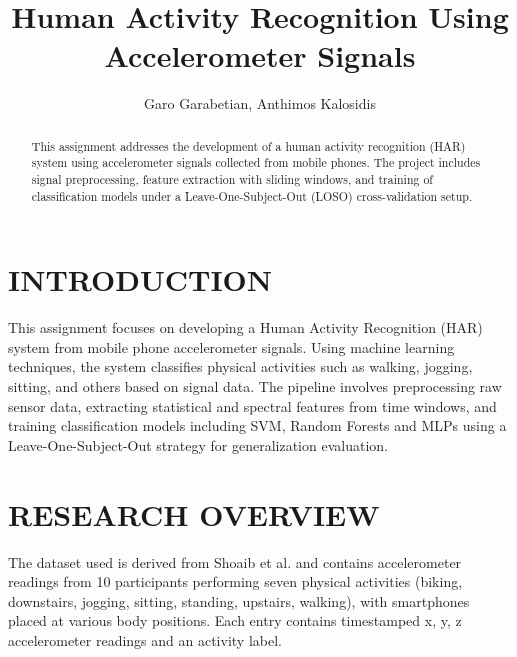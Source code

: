 \documentclass[runningheads]{llncs}
\begin{document}
\title{Human Activity Recognition Using Accelerometer Signals}

\author{Garo Garabetian, Anthimos Kalosidis}

\newpage
\maketitle
\pagestyle{plain}

\begin{abstract}
This assignment addresses the development of a human activity recognition (HAR) system using accelerometer signals collected from mobile phones. The project includes signal preprocessing, feature extraction with sliding windows, and training of classification models under a Leave-One-Subject-Out (LOSO) cross-validation setup.
\end{abstract}

\section{INTRODUCTION}
This assignment focuses on developing a Human Activity Recognition (HAR) system from mobile phone accelerometer signals. Using machine learning techniques, the system classifies physical activities such as walking, jogging, sitting, and others based on signal data. The pipeline involves preprocessing raw sensor data, extracting statistical and spectral features from time windows, and training classification models including SVM, Random Forests and MLPs using a Leave-One-Subject-Out strategy for generalization evaluation.

\section{RESEARCH OVERVIEW}
The dataset used is derived from Shoaib et al. \cite{Shoaib2015} and contains accelerometer readings from 10 participants performing seven physical activities (biking, downstairs, jogging, sitting, standing, upstairs, walking), with smartphones placed at various body positions. Each entry contains timestamped x, y, z accelerometer readings and an activity label.
\end{document}
